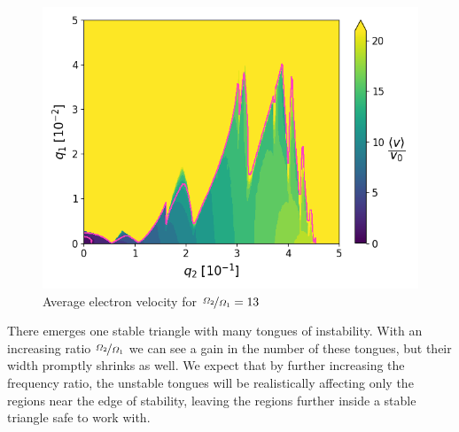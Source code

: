 \begin{figure}[H]
	\centering
	\includegraphics[width=\linewidth]{img/0_ions_1_electrons_q1_0.0-0.05_q2_0.0-0.5_960x960_13_1000.png}
	\caption{Average electron velocity for $\nicefrac{\Omega_2}{\Omega_1} = 13$}
	\label{fig:stabil-eta=13}
\end{figure}

There emerges one stable triangle with many tongues of instability. With an increasing ratio $\nicefrac{\Omega_2}{\Omega_1}$ we can see a gain in the number of these tongues, but their width promptly shrinks as well. We expect that by further increasing the frequency ratio, the unstable tongues will be realistically affecting only the regions near the edge of stability, leaving the regions further inside a stable triangle safe to work with.


